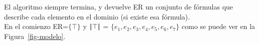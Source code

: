 






El algoritmo siempre termina, y devuelve ER un conjunto de f\'ormulas que describe cada elemento en el dominio (si existe esa f\'ormula). \\

En el comienzo ER=$\{\top\}$ y $|\!|\top|\!|$ = $\{e_1, e_2, e_3, e_4, e_5, e_6, e_7\}$ como se puede ver en la Figura~\ref{fig-modelo}.\\

